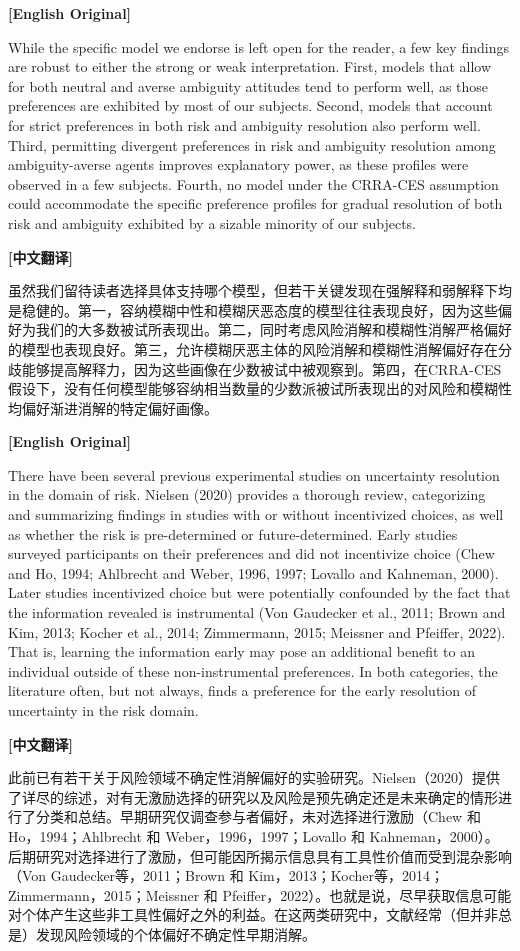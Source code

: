 \documentclass[12pt,a4paper]{ctexart}
\newenvironment{original}{%
  \par\medskip\noindent\textbf{[English Original]}\par\smallskip
  \color{black}\small
}{%
  \par\medskip
}
\newenvironment{translation}{%
  \par\noindent\textbf{[中文翻译]}\par\smallskip
  \color{blue}\small
}{%
  \par\bigskip
}
\theoremstyle{definition}
\theoremstyle{remark}
\begin{document}
\begin{original}
While the specific model we endorse is left open for the reader, a few key findings are robust to either the strong or weak interpretation. First, models that allow for both neutral and averse ambiguity attitudes tend to perform well, as those preferences are exhibited by most of our subjects. Second, models that account for strict preferences in both risk and ambiguity resolution also perform well. Third, permitting divergent preferences in risk and ambiguity resolution among ambiguity-averse agents improves explanatory power, as these profiles were observed in a few subjects. Fourth, no model under the CRRA-CES assumption could accommodate the specific preference profiles for gradual resolution of both risk and ambiguity exhibited by a sizable minority of our subjects.
\end{original}
\begin{translation}
虽然我们留待读者选择具体支持哪个模型，但若干关键发现在强解释和弱解释下均是稳健的。第一，容纳模糊中性和模糊厌恶态度的模型往往表现良好，因为这些偏好为我们的大多数被试所表现出。第二，同时考虑风险消解和模糊性消解严格偏好的模型也表现良好。第三，允许模糊厌恶主体的风险消解和模糊性消解偏好存在分歧能够提高解释力，因为这些画像在少数被试中被观察到。第四，在CRRA-CES假设下，没有任何模型能够容纳相当数量的少数派被试所表现出的对风险和模糊性均偏好渐进消解的特定偏好画像。
\end{translation}

\begin{original}
There have been several previous experimental studies on uncertainty resolution in the domain of risk. Nielsen (2020) provides a thorough review, categorizing and summarizing findings in studies with or without incentivized choices, as well as whether the risk is pre-determined or future-determined. Early studies surveyed participants on their preferences and did not incentivize choice (Chew and Ho, 1994; Ahlbrecht and Weber, 1996, 1997; Lovallo and Kahneman, 2000). Later studies incentivized choice but were potentially confounded by the fact that the information revealed is instrumental (Von Gaudecker et al., 2011; Brown and Kim, 2013; Kocher et al., 2014; Zimmermann, 2015; Meissner and Pfeiffer, 2022). That is, learning the information early may pose an additional benefit to an individual outside of these non-instrumental preferences. In both categories, the literature often, but not always, finds a preference for the early resolution of uncertainty in the risk domain.
\end{original}
\begin{translation}
此前已有若干关于风险领域不确定性消解偏好的实验研究。Nielsen（2020）提供了详尽的综述，对有无激励选择的研究以及风险是预先确定还是未来确定的情形进行了分类和总结。早期研究仅调查参与者偏好，未对选择进行激励（Chew 和 Ho，1994；Ahlbrecht 和 Weber，1996，1997；Lovallo 和 Kahneman，2000）。后期研究对选择进行了激励，但可能因所揭示信息具有工具性价值而受到混杂影响（Von Gaudecker等，2011；Brown 和 Kim，2013；Kocher等，2014；Zimmermann，2015；Meissner 和 Pfeiffer，2022）。也就是说，尽早获取信息可能对个体产生这些非工具性偏好之外的利益。在这两类研究中，文献经常（但并非总是）发现风险领域的个体偏好不确定性早期消解。
\end{translation}
\end{document}
